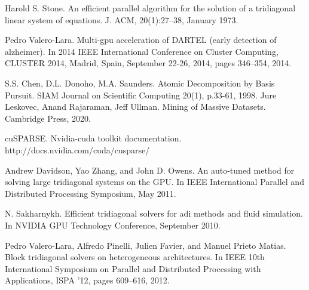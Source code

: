 \begin{thebibliography}{1}
  Harold S. Stone. An efficient parallel algorithm for the solution of a tridiagonal linear system of
  equations. J. ACM, 20(1):27–38, January 1973.
  
  Pedro Valero-Lara. Multi-gpu acceleration of DARTEL (early detection of alzheimer). In 2014
  IEEE International Conference on Cluster Computing, CLUSTER 2014, Madrid, Spain, September
  22-26, 2014, pages 346–354, 2014.
  
  S.S. Chen, D.L. Donoho, M.A. Saunders. Atomic Decomposition by Basis Pursuit. SIAM Journal on Scientific Computing 20(1), p.33-61, 1998.
  Jure Leskovec, Anand Rajaraman, Jeff Ullman. Mining of Massive Datasets. Cambridge Press, 2020.

  cuSPARSE. Nvidia-cuda toolkit documentation.
  http://docs.nvidia.com/cuda/cusparse/

  Andrew Davidson, Yao Zhang, and John D. Owens. An auto-tuned method for
solving large tridiagonal systems on the GPU. In IEEE International Parallel and
Distributed Processing Symposium, May 2011.

  N. Sakharnykh. Efficient tridiagonal solvers for adi methods and fluid simulation.
  In NVIDIA GPU Technology Conference, September 2010.

  Pedro Valero-Lara, Alfredo Pinelli, Julien Favier, and Manuel Prieto Matias. Block
tridiagonal solvers on heterogeneous architectures. In IEEE 10th International
Symposium on Parallel and Distributed Processing with Applications, ISPA ’12,
pages 609–616, 2012.
  \end{thebibliography}